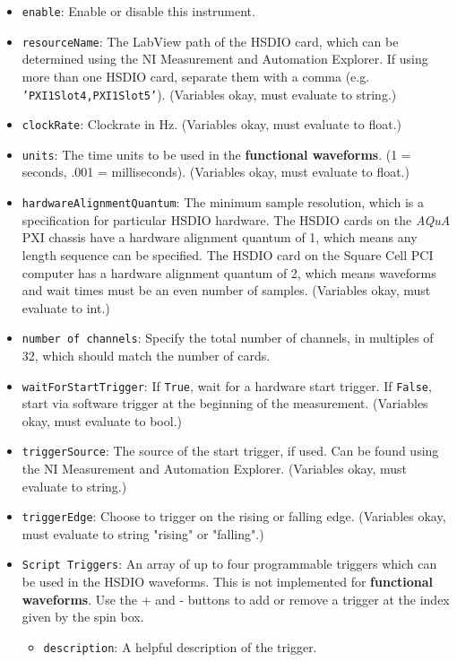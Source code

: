 \documentclass[pdftex,11pt,letterpaper]{article}
\begin{document}
\begin{itemize}
\item \texttt{enable}: Enable or disable this instrument.
\item \texttt{resourceName}:  The LabView path of the HSDIO card, which can be determined using the NI Measurement and Automation Explorer.  If using more than one HSDIO card, separate them with a comma (e.g. \texttt{'PXI1Slot4,PXI1Slot5'}).  (Variables okay, must evaluate to string.)
\item \texttt{clockRate}:  Clockrate in Hz.  (Variables okay, must evaluate to float.)
\item \texttt{units}:  The time units to be used in the \textbf{functional waveforms}.  (1 = seconds, .001 = milliseconds).  (Variables okay, must evaluate to float.)
\item \texttt{hardwareAlignmentQuantum}:  The minimum sample resolution, which is a specification for particular HSDIO hardware.  The HSDIO cards on the \textit{AQuA} PXI chassis have a hardware alignment quantum of 1, which means any length sequence can be specified.  The HSDIO card on the Square Cell PCI computer has a hardware alignment quantum of 2, which means waveforms and wait times must be an even number of samples.  (Variables okay, must evaluate to int.)
\item \texttt{number of channels}:  Specify the total number of channels, in multiples of 32, which should match the number of cards.
\item \texttt{waitForStartTrigger}:  If \texttt{True}, wait for a hardware start trigger.  If \texttt{False}, start via software trigger at the beginning of the measurement.  (Variables okay, must evaluate to bool.)
\item \texttt{triggerSource}:  The source of the start trigger, if used.  Can be found using the NI Measurement and Automation Explorer.  (Variables okay, must evaluate to string.)
\item \texttt{triggerEdge}:  Choose to trigger on the rising or falling edge.  (Variables okay, must evaluate to string "rising" or "falling".)
\item \texttt{Script Triggers}:  An array of up to four programmable triggers which can be used in the HSDIO waveforms.  This is not implemented for \textbf{functional waveforms}.  Use the + and - buttons to add or remove a trigger at the index given by the spin box.
\begin{itemize}
\item \texttt{description}:  A helpful description of the trigger.

\end{itemize}
\end{itemize}
\end{document}
